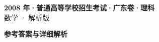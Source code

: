 \documentclass[zihao=-4, a4paper]{ctexart}
\begin{document}
\begin{center}
  {\Large\bfseries 2008 年·普通高等学校招生考试·广东卷·理科}\\[4pt]
  {\large 数学 · 解析版}
\end{center}
\medskip
{}

\clearpage
{}
\begin{center}{\Large\bfseries 参考答案与详细解析}\end{center}
\medskip

\end{document}
